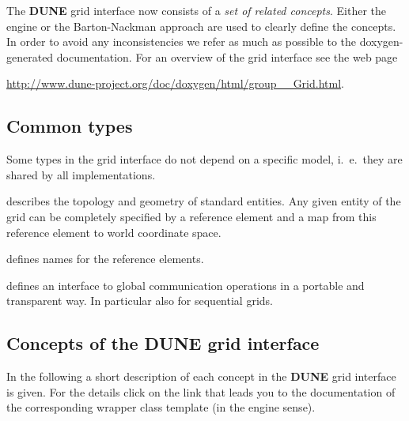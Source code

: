 \documentclass[11pt,a4paper,headinclude,footinclude,DIV16,headings=normal]{scrreprt}
\newcommand{\Dune}{{\sffamily\bfseries DUNE}\xspace}
\begin{document}
The \Dune{} grid interface now consists of a \textit{set of related concepts}.
Either the engine or the Barton-Nackman approach are used to clearly
define the concepts. In order to avoid any inconsistencies we refer as
much as possible to the doxygen-generated documentation. For an
overview of the grid interface see the web page
\begin{center}
\url{http://www.dune-project.org/doc/doxygen/html/group__Grid.html}.
\end{center}


\subsection{Common types}

Some types in the grid interface do not depend on a specific model,
i.~e.~they are shared by all implementations.


describes the topology and geometry of standard entities. Any given
entity of the grid can be completely specified by a reference element
and a map from this reference element to world coordinate space.


defines names for the reference elements.


defines an interface to global communication operations in a portable
and transparent way. In particular also for sequential grids.


\subsection{Concepts of the \texorpdfstring{\Dune{}}{DUNE} grid interface}

In the following a short description of each concept in the \Dune{}
grid interface is given. For the details click on the link that leads
you to the documentation of the corresponding wrapper class template
(in the engine sense).

\end{document}
